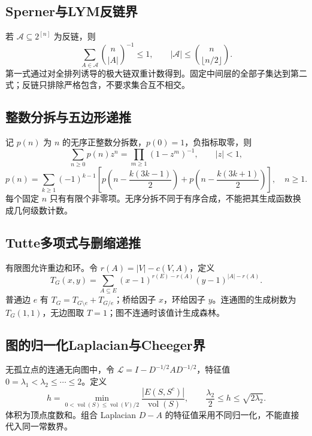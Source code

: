 \documentclass[../main.tex]{subfiles}
\begin{document}
\subsection{Sperner与LYM反链界}
若 $\mathcal A\subseteq2^{[n]}$ 为反链，则
\[
\sum_{A\in\mathcal A}\binom n{|A|}^{-1}\le1,
\qquad |\mathcal A|\le\binom n{\lfloor n/2\rfloor}.
\]
第一式通过对全排列诱导的极大链双重计数得到。固定中间层的全部子集达到第二式；反链只排除严格包含，不要求集合互不相交。
\subsection{整数分拆与五边形递推}
记 $p(n)$ 为 $n$ 的无序正整数分拆数，$p(0)=1$，负指标取零，则
\[
\sum_{n\ge0}p(n)z^n=\prod_{m\ge1}(1-z^m)^{-1},\qquad |z|<1,
\]
\[
p(n)=\sum_{k\ge1}(-1)^{k-1}
\left[p\!\left(n-\frac{k(3k-1)}2\right)
+p\!\left(n-\frac{k(3k+1)}2\right)\right],\quad n\ge1.
\]
每个固定 $n$ 只有有限个非零项。无序分拆不同于有序合成，不能把其生成函数换成几何级数计数。
\subsection{Tutte多项式与删缩递推}
有限图允许重边和环。令 $r(A)=|V|-c(V,A)$，定义
\[
T_G(x,y)=\sum_{A\subseteq E}(x-1)^{r(E)-r(A)}(y-1)^{|A|-r(A)}.
\]
普通边 $e$ 有 $T_G=T_{G\setminus e}+T_{G/e}$；桥给因子 $x$，环给因子 $y$。连通图的生成树数为 $T_G(1,1)$，无边图取 $T=1$；图不连通时该值计生成森林。
\subsection{图的归一化Laplacian与Cheeger界}
无孤立点的连通无向图中，令 $\mathcal L=I-D^{-1/2}AD^{-1/2}$，特征值 $0=\lambda_1<\lambda_2\le\cdots\le2$。定义
\[
h=\min_{0<\operatorname{vol}(S)\le\operatorname{vol}(V)/2}
\frac{|E(S,S^c)|}{\operatorname{vol}(S)},\qquad
\frac{\lambda_2}{2}\le h\le\sqrt{2\lambda_2}.
\]
体积为顶点度数和。组合 Laplacian $D-A$ 的特征值采用不同归一化，不能直接代入同一常数界。
\clearpage
\end{document}
